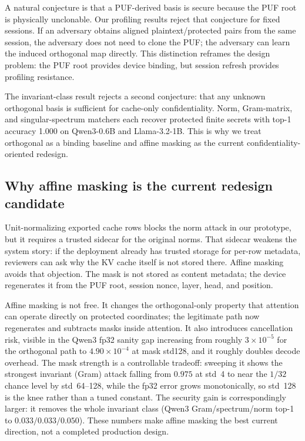 A natural conjecture is that a PUF-derived basis is secure because the PUF root is physically unclonable. Our profiling results reject that conjecture for fixed sessions. If an adversary obtains aligned plaintext/protected pairs from the same session, the adversary does not need to clone the PUF; the adversary can learn the induced orthogonal map directly. This distinction reframes the design problem: the PUF root provides device binding, but session refresh provides profiling resistance.

The invariant-class result rejects a second conjecture: that any unknown orthogonal basis is sufficient for cache-only confidentiality. Norm, Gram-matrix, and singular-spectrum matchers each recover protected finite secrets with top-1 accuracy 1.000 on Qwen3-0.6B and Llama-3.2-1B. This is why we treat orthogonal \sys{} as a binding baseline and affine masking as the current confidentiality-oriented redesign.

\subsection{Why affine masking is the current redesign candidate}

Unit-normalizing exported cache rows blocks the norm attack in our prototype, but it requires a trusted sidecar for the original norms. That sidecar weakens the system story: if the deployment already has trusted storage for per-row metadata, reviewers can ask why the KV cache itself is not stored there. Affine masking avoids that objection. The mask is not stored as content metadata; the device regenerates it from the PUF root, session nonce, layer, head, and position.

Affine masking is not free. It changes the orthogonal-only property that attention can operate directly on protected coordinates; the legitimate path now regenerates and subtracts masks inside attention. It also introduces cancellation risk, visible in the Qwen3 fp32 sanity gap increasing from roughly $3\times10^{-5}$ for the orthogonal path to $4.90\times10^{-4}$ at mask std128, and it roughly doubles decode overhead. The mask strength is a controllable tradeoff: sweeping it shows the strongest invariant (Gram) attack falling from $0.975$ at std~4 to near the $1/32$ chance level by std~64--128, while the fp32 error grows monotonically, so std~128 is the knee rather than a tuned constant. The security gain is correspondingly larger: it removes the whole invariant class (Qwen3 Gram/spectrum/norm top-1 to $0.033/0.033/0.050$). These numbers make affine masking the best current direction, not a completed production design.

